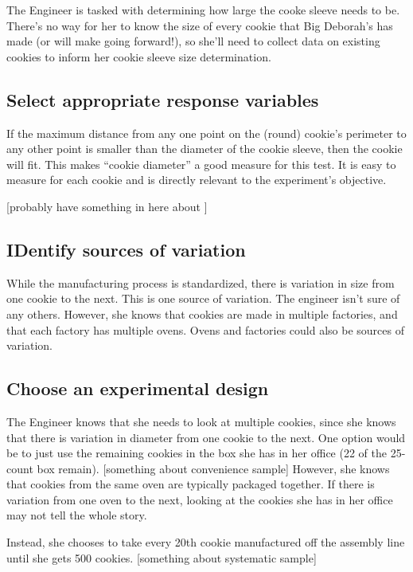 \documentclass[]{book}
\begin{document}
The Engineer is tasked with determining how large the cooke sleeve needs
to be. There's no way for her to know the size of every cookie that Big
Deborah's has made (or will make going forward!), so she'll need to
collect data on existing cookies to inform her cookie sleeve size
determination.

\subsection{Select appropriate response
variables}\label{select-appropriate-response-variables}

If the maximum distance from any one point on the (round) cookie's
perimeter to any other point is smaller than the diameter of the cookie
sleeve, then the cookie will fit. This makes ``cookie diameter'' a good
measure for this test. It is easy to measure for each cookie and is
directly relevant to the experiment's objective.

{[}probably have something in here about {]}

\subsection{IDentify sources of
variation}\label{identify-sources-of-variation}

While the manufacturing process is standardized, there is variation in
size from one cookie to the next. This is one source of variation. The
engineer isn't sure of any others. However, she knows that cookies are
made in multiple factories, and that each factory has multiple ovens.
Ovens and factories could also be sources of variation.

\subsection{Choose an experimental
design}\label{choose-an-experimental-design-2}

The Engineer knows that she needs to look at multiple cookies, since she
knows that there is variation in diameter from one cookie to the next.
One option would be to just use the remaining cookies in the box she has
in her office (22 of the 25-count box remain). {[}something about
convenience sample{]} However, she knows that cookies from the same oven
are typically packaged together. If there is variation from one oven to
the next, looking at the cookies she has in her office may not tell the
whole story.

Instead, she chooses to take every 20th cookie manufactured off the
assembly line until she gets 500 cookies. {[}something about systematic
sample{]}
\end{document}
